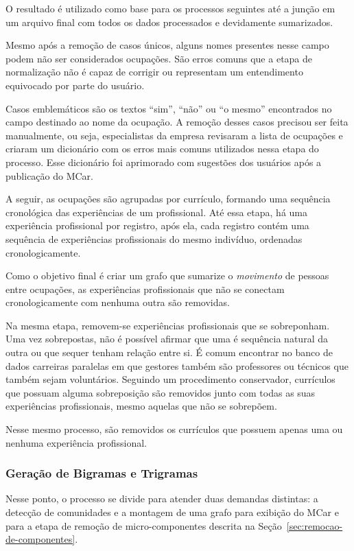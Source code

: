 \documentclass[12pt,a4paper]{article}
\begin{document}
O resultado é utilizado como base para os processos seguintes até a junção em um arquivo final com todos os dados processados e devidamente sumarizados.

Mesmo após a remoção de casos únicos, alguns nomes presentes nesse campo podem não ser considerados ocupações. São erros comuns que a etapa de normalização não é capaz de corrigir ou representam um entendimento equivocado por parte do usuário.

Casos emblemáticos são os textos \enquote{sim}, \enquote{não} ou \enquote{o mesmo} encontrados no campo destinado ao nome da ocupação. A remoção desses casos precisou ser feita manualmente, ou seja, especialistas da empresa revisaram a lista de ocupações e criaram um dicionário com os erros mais comuns utilizados nessa etapa do processo. Esse dicionário foi aprimorado com sugestões dos usuários após a publicação do MCar.

A seguir, as ocupações são agrupadas por currículo, formando uma sequência cronológica das experiências de um profissional. Até essa etapa, há uma experiência profissional por registro, após ela, cada registro contém uma sequência de experiências profissionais do mesmo indivíduo, ordenadas cronologicamente.

Como o objetivo final é criar um grafo que sumarize o \textit{movimento} de pessoas entre ocupações, as experiências profissionais que não se conectam cronologicamente com nenhuma outra são removidas.

Na mesma etapa, removem-se experiências profissionais que se sobreponham. Uma vez sobrepostas, não é possível afirmar que uma é sequência natural da outra ou que sequer tenham relação entre si. É comum encontrar no banco de dados carreiras paralelas em que gestores também são professores ou técnicos que também sejam voluntários. Seguindo um procedimento conservador, currículos que possuam alguma sobreposição são removidos junto com todas as suas experiências profissionais, mesmo aquelas que não se sobrepõem.
    
Nesse mesmo processo, são removidos os currículos que possuem apenas uma ou nenhuma experiência profissional.


\subsubsection{Geração de Bigramas e Trigramas} \label{sec:geracao-de-trigramas}

Nesse ponto, o processo se divide para atender duas demandas distintas: a detecção de comunidades e a montagem de uma grafo para exibição do MCar e para a etapa de remoção de micro-componentes descrita na Seção~\ref{sec:remocao-de-componentes}.
\end{document}
